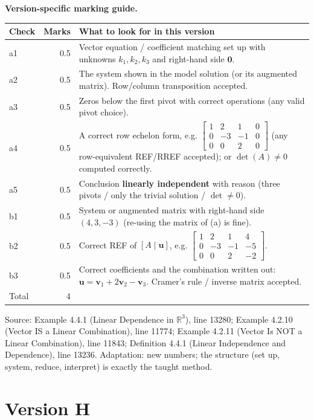 \documentclass[11pt,a4paper]{article}
\newcommand{\Src}[1]{{\footnotesize\color{black!65}Source: #1}}
\begin{document}
\textbf{Version-specific marking guide.}\par
\begin{tabularx}{\linewidth}{@{}l r X@{}}\toprule Check & Marks & What to look for in this version\\\midrule
a1 & 0.5 & Vector equation / coefficient matching set up with unknowns $k_1,k_2,k_3$ and right-hand side $\mathbf{0}$.\\
a2 & 0.5 & The system shown in the model solution (or its augmented matrix). Row/column transposition accepted.\\
a3 & 0.5 & Zeros below the first pivot with correct operations (any valid pivot choice).\\
a4 & 0.5 & A correct row echelon form, e.g. $\left[\begin{array}{ccc|c} 1 & 2 & 1 & 0 \\ 0 & -3 & -1 & 0 \\ 0 & 0 & 2 & 0 \end{array}\right]$ (any row-equivalent REF/RREF accepted); or $\det(A)\neq0$ computed correctly.\\
a5 & 0.5 & Conclusion \textbf{linearly independent} with reason (three pivots / only the trivial solution / $\det\neq0$).\\
b1 & 0.5 & System or augmented matrix with right-hand side $(4,3,-3)$ (re-using the matrix of (a) is fine).\\
b2 & 0.5 & Correct REF of $[A\mid\mathbf{u}]$, e.g. $\left[\begin{array}{ccc|c} 1 & 2 & 1 & 4 \\ 0 & -3 & -1 & -5 \\ 0 & 0 & 2 & -2 \end{array}\right]$.\\
b3 & 0.5 & Correct coefficients and the combination written out: $\mathbf{u}=\mathbf{v}_1+2\mathbf{v}_2-\mathbf{v}_3$. Cramer's rule / inverse matrix accepted.\\
\midrule Total & 4 & \\\bottomrule\end{tabularx}
\Src{Example 4.4.1 (Linear Dependence in $\mathbb{R}^3$), line 13280; Example 4.2.10 (Vector IS a Linear Combination), line 11774; Example 4.2.11 (Vector Is NOT a Linear Combination), line 11843; Definition 4.4.1 (Linear Independence and Dependence), line 13236. Adaptation: new numbers; the structure (set up, system, reduce, interpret) is exactly the taught method.}\par
\clearpage\section*{Version H}
\end{document}
